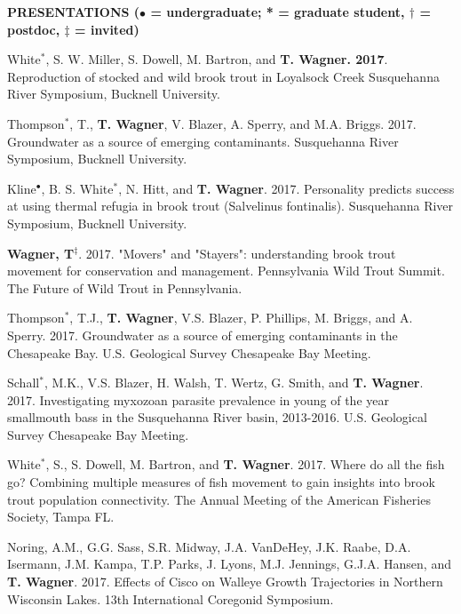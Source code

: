 \documentclass[10pt]{article}
\begin{document}
\begin{flushleft}
\vspace{8pt}
\centerline {\bf{PRESENTATIONS ({\small $\bullet$ = undergraduate; * = graduate student, $\dagger$ = postdoc, $\ddagger$ = invited})}}
\vspace{5pt}
\begin{etaremune}
\item White$^*$, S. W. Miller, S. Dowell, M. Bartron, and {\bf T. Wagner. 2017}. Reproduction of stocked and wild brook trout in Loyalsock Creek  Susquehanna River Symposium, Bucknell University.

\item Thompson$^*$, T., {\bf T. Wagner}, V. Blazer, A. Sperry, and M.A. Briggs. 2017. Groundwater as a source of emerging contaminants. Susquehanna River Symposium, Bucknell University.

\item Kline$^\bullet$, B. S. White$^*$, N. Hitt, and {\bf T. Wagner}. 2017. Personality predicts success at using thermal refugia in brook trout (Salvelinus fontinalis). Susquehanna River Symposium, Bucknell University.

\item {\bf Wagner, T}$^\ddagger$. 2017. "Movers" and "Stayers": understanding brook trout movement for conservation and management. Pennsylvania Wild Trout Summit. The Future of Wild Trout in Pennsylvania.

\item Thompson$^*$, T.J., {\bf T. Wagner}, V.S. Blazer, P. Phillips, M. Briggs, and A. Sperry. 2017. Groundwater as a source of emerging contaminants in the Chesapeake Bay. U.S. Geological Survey Chesapeake Bay Meeting.

\item Schall$^*$, M.K., V.S. Blazer, H. Walsh, T. Wertz, G. Smith, and {\bf T. Wagner}. 2017. Investigating myxozoan parasite prevalence in young of the year smallmouth bass in the Susquehanna River basin, 2013-2016. U.S. Geological Survey Chesapeake Bay Meeting.

\item White$^*$, S., S. Dowell, M. Bartron, and {\bf T. Wagner}. 2017. Where do all the fish go? Combining multiple measures of fish movement to gain insights into brook trout population connectivity. The Annual Meeting of the American Fisheries Society, Tampa FL.

\item Noring, A.M., G.G. Sass, S.R. Midway, J.A. VanDeHey, J.K. Raabe, D.A. Isermann, J.M. Kampa, T.P. Parks, J. Lyons, M.J. Jennings, G.J.A. Hansen, and {\bf T. Wagner}. 2017. Effects of Cisco on Walleye Growth Trajectories in Northern Wisconsin Lakes. 13th International Coregonid Symposium.


\end{etaremune}
\end{flushleft}
\end{document}
